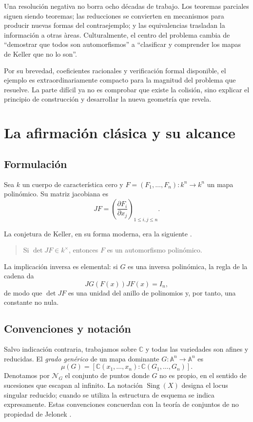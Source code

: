 \documentclass[11pt]{article}
\theoremstyle{definition}
\theoremstyle{remark}
\newcommand{\C}{\mathbb{C}}
\newcommand{\A}{\mathbb{A}}
\newcommand{\Sing}{\operatorname{Sing}}
\begin{document}
Una resoluci\'on negativa no borra ocho d\'ecadas de trabajo. Los teoremas
parciales siguen siendo teoremas; las reducciones se convierten en mecanismos
para producir nuevas formas del contraejemplo; y las equivalencias trasladan
la informaci\'on a otras \`areas. Culturalmente, el centro del problema cambia
de ``demostrar que todos son automorfismos'' a ``clasificar y comprender los
mapas de Keller que no lo son''.

Por su brevedad, coeficientes racionales y verificaci\'on formal disponible, el
ejemplo es extraordinariamente compacto para la magnitud del problema que
resuelve. La parte dif\'icil ya no es comprobar que existe la colisi\'on, sino
explicar el principio de construcci\'on y desarrollar la nueva geometr\'ia que
revela.

\section{La afirmaci\'on cl\'asica y su alcance}

\subsection{Formulaci\'on}

Sea $k$ un cuerpo de caracter\'istica cero y
$F=(F_1,\ldots,F_n)\colon k^n\to k^n$ un mapa polin\'omico. Su matriz
jacobiana es
\[
JF=\left(\frac{\partial F_i}{\partial x_j}\right)_{1\leq i,j\leq n}.
\]

La conjetura de Keller, en su forma moderna, era la siguiente
\cite{Keller1939,BassConnellWright1982,VanDenEssen2000}.

\begin{quote}
Si $\det JF\in k^\times$, entonces $F$ es un automorfismo polin\'omico.
\end{quote}

La implicaci\'on inversa es elemental: si $G$ es una inversa polin\'omica,
la regla de la cadena da
\[
JG(F(x))JF(x)=I_n,
\]
de modo que $\det JF$ es una unidad del anillo de polinomios y, por tanto,
una constante no nula.

\subsection{Convenciones y notaci\'on}

Salvo indicaci\'on contraria, trabajamos sobre $\C$ y todas las variedades son
afines y reducidas. El \emph{grado gen\'erico} de un mapa dominante
$G\colon\A^n\to\A^n$ es
\[
\mu(G)=[\C(x_1,\ldots,x_n):\C(G_1,\ldots,G_n)].
\]
Denotamos por $\mathcal N_G$ el conjunto de puntos donde $G$ no es propio, en
el sentido de sucesiones que escapan al infinito. La notaci\'on $\Sing(X)$
designa el locus singular reducido; cuando se utiliza la estructura de
esquema se indica expresamente. Estas convenciones concuerdan con la teor\'ia
de conjuntos de no propiedad de Jelonek \cite{Jelonek1993}.
\end{document}

